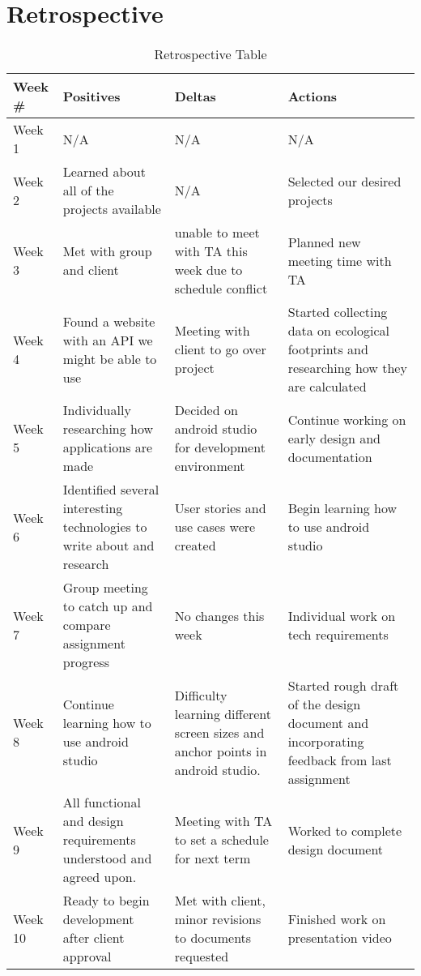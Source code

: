 \documentclass[onecolumn, draftclsnofoot,10pt, compsoc, tikz]{IEEEtran}
\begin{document}
\section{Retrospective}
\begin{table}[h!]
\caption{Retrospective Table}
\begin{center}
\begin{tabular}{ | m{2cm} | m{4cm} | m{4cm}| m{4cm} | }
    \hline Week \# & Positives & Deltas & Actions \\
    \hline Week 1 
    & N/A
    & N/A 
    & N/A\\
    \hline Week 2 
    & Learned about all of the projects available
    & N/A
    & Selected our desired projects\\
    \hline Week 3 
    & Met with group and client
    & unable to meet with TA this week due to schedule conflict
    & Planned new meeting time with TA\\
    \hline Week 4 
    & Found a website with an API we might be able to use
    & Meeting with client to go over project
    & Started collecting data on ecological footprints and researching how they are calculated\\
    \hline Week 5 
    & Individually researching how applications are made
    & Decided on android studio for development environment
    & Continue working on early design and documentation \\
    \hline Week 6 
    & Identified several interesting technologies to write about and research 
    & User stories and use cases were created
    & Begin learning how to use android studio \\
    \hline Week 7 
    & Group meeting to catch up and compare assignment progress
    & No changes this week 
    & Individual work on tech requirements \\
    \hline Week 8 
    & Continue learning how to use android studio
    & Difficulty learning different screen sizes and anchor points in android studio. 
    & Started rough draft of the design document and incorporating feedback from last assignment \\
    \hline Week 9 
    & All functional and design requirements understood and agreed upon. 
    & Meeting with TA to set a schedule for next term
    & Worked to complete design document \\
    \hline Week 10 
    & Ready to begin development after client approval
    & Met with client, minor revisions to documents requested
    & Finished work on presentation video\\
    \hline
\end{tabular}
\end{center}
\end{table}
\end{document}
